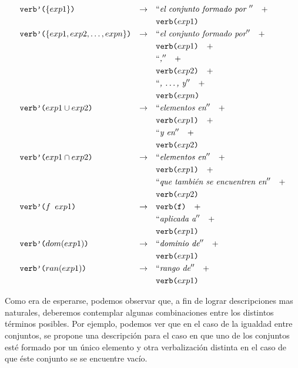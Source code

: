 \begin{align*}
&\nlgfun{verb'($\{exp1\}$)} & \rightarrow \quad & \nlgtext{el conjunto formado por } \quad +  \\
& &											 		& \nlgfun{verb($exp1$)} \\
&\nlgfun{verb'($\{exp1, exp2, \ldots ,expn\}$)} & \rightarrow \quad & \nlgtext{el conjunto formado por} \quad +  \\
& &											 		& \nlgfun{verb($exp1$)} \quad +  \\
& &											 		& \nlgtext{,} \quad +  \\
& &											 		& \nlgfun{verb($exp2$)} \quad +  \\
& &											 		& \nlgtext{, \ldots , y} \quad +  \\
& &											 		& \nlgfun{verb($expn$)} \\
&\nlgfun{verb'($exp1 \cup exp2$)} & \rightarrow \quad & \nlgtext{elementos en} \quad +  \\
& &											 		& \nlgfun{verb($exp1$)} \quad +  \\
& &											 		& \nlgtext{y en} \quad +  \\
& &											 		& \nlgfun{verb($exp2$)} \\
&\nlgfun{verb'($exp1 \cap exp2$)} & \rightarrow \quad & \nlgtext{elementos en} \quad +  \\
& &											 		& \nlgfun{verb($exp1$)} \quad +  \\
& &											 		& \nlgtext{que también se encuentren en} \quad +  \\
& &											 		& \nlgfun{verb($exp2$)} \\
&\nlgfun{verb'($f~exp1$)} & \rightarrow \quad & \nlgfun{verb(f)} \quad +  \\
& &											 		& \nlgtext{aplicada a} \quad +  \\
& &											 		& \nlgfun{verb($exp1$)} \\
&\nlgfun{verb'($dom(exp1)$)} & \rightarrow \quad & \nlgtext{dominio de} \quad +  \\
& &											 		& \nlgfun{verb($exp1$)} \\
&\nlgfun{verb'($ran(exp1)$)} & \rightarrow \quad & \nlgtext{rango de} \quad +  \\
& &											 		& \nlgfun{verb($exp1$)} \\
\end{align*} 

\bigskip
Como era de esperarse, podemos observar que, a fin de lograr descripciones mas naturales, deberemos contemplar algunas combinaciones entre los distintos términos posibles. Por ejemplo, podemos ver que en el caso de la igualdad entre conjuntos, se propone una descripción para el caso en que uno de los conjuntos esté formado por un único elemento y otra verbalización distinta en el caso de que éste conjunto se se encuentre vacío.

